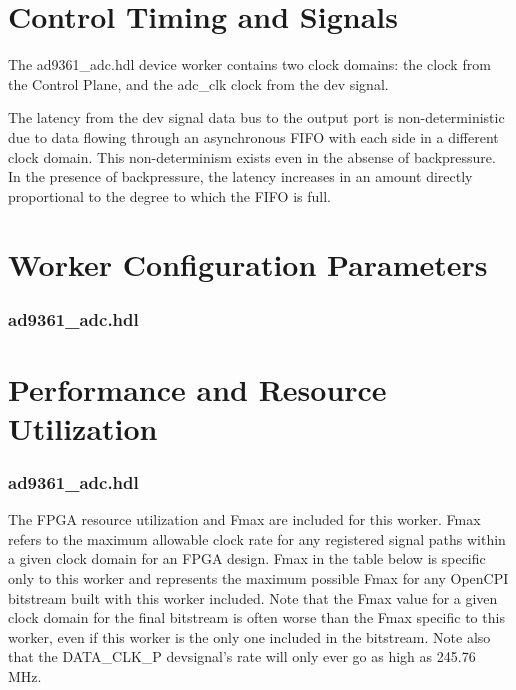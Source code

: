 \documentclass{article}
\def\comp{ad9361\_adc}
\edef\ecomp{ad9361_adc}
\begin{document}
\section*{Control Timing and Signals}
The \comp{}.hdl device worker contains two clock domains: the clock from the Control Plane, and the adc\_clk clock from the dev signal.\par\bigskip
\noindent The latency from the dev signal data bus to the output port is non-deterministic due to data flowing through an asynchronous FIFO with each side in a different clock domain. This non-determinism exists even in the absense of backpressure. In the presence of backpressure, the latency increases in an amount directly proportional to the degree to which the FIFO is full.

\section*{Worker Configuration Parameters}
\subsubsection*{\comp.hdl}

\section*{Performance and Resource Utilization}
\subsubsection*{\comp.hdl}
The FPGA resource utilization and Fmax are included for this worker. Fmax refers to the maximum allowable clock rate for any registered signal paths within a given clock domain for an FPGA design. Fmax in the table below is specific only to this worker and represents the maximum possible Fmax for any OpenCPI bitstream built with this worker included. Note that the Fmax value for a given clock domain for the final bitstream is often worse than the Fmax specific to this worker, even if this worker is the only one included in the bitstream. Note also that the DATA\_CLK\_P devsignal's rate will only ever go as high as 245.76 MHz\cite{adi_ug570}. \\ \\

%


\end{document}
